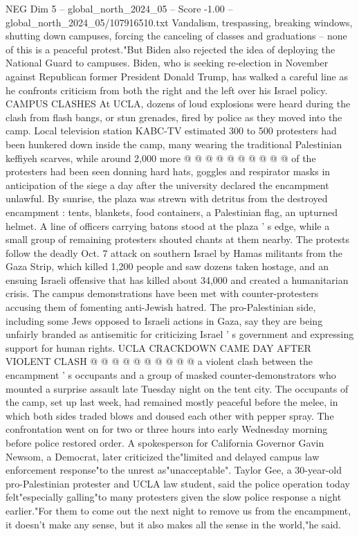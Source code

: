 \begin{textsample}{NEG Dim 5 – global\_north\_2024\_05 – Score -1.00 – global\_north\_2024\_05/107916510.txt}
Vandalism, trespassing, breaking windows, shutting down campuses, forcing the canceling of classes and graduations -- none of this is a peaceful protest."But Biden also rejected the idea of deploying the National Guard to campuses.
Biden, who is seeking re-election in November against Republican former President Donald Trump, has walked a careful line as he confronts criticism from both the right and the left over his Israel policy.
CAMPUS CLASHES At UCLA, dozens of loud explosions were heard during the clash from flash bangs, or stun grenades, fired by police as they moved into the camp.
Local television station KABC-TV estimated 300 to 500 protesters had been hunkered down inside the camp, many wearing the traditional Palestinian keffiyeh scarves, while around 2,000 more @ @ @ @ @ @ @ @ @ @ of the protesters had been seen donning hard hats, goggles and respirator masks in anticipation of the siege a day after the university declared the encampment unlawful.
By sunrise, the plaza was strewn with detritus from the destroyed encampment : tents, blankets, food containers, a Palestinian flag, an upturned helmet.
A line of officers carrying batons stood at the plaza ' s edge, while a small group of remaining protesters shouted chants at them nearby.
The protests follow the deadly Oct. 7 attack on southern Israel by Hamas militants from the Gaza Strip, which killed 1,200 people and saw dozens taken hostage, and an ensuing Israeli offensive that has killed about 34,000 and created a humanitarian crisis.
The campus demonstrations have been met with counter-protesters accusing them of fomenting anti-Jewish hatred.
The pro-Palestinian side, including some Jews opposed to Israeli actions in Gaza, say they are being unfairly branded as antisemitic for criticizing Israel ' s government and expressing support for human rights.
UCLA CRACKDOWN CAME DAY AFTER VIOLENT CLASH @ @ @ @ @ @ @ @ @ @ a violent clash between the encampment ' s occupants and a group of masked counter-demonstrators who mounted a surprise assault late Tuesday night on the tent city.
The occupants of the camp, set up last week, had remained mostly peaceful before the melee, in which both sides traded blows and doused each other with pepper spray.
The confrontation went on for two or three hours into early Wednesday morning before police restored order.
A spokesperson for California Governor Gavin Newsom, a Democrat, later criticized the"limited and delayed campus law enforcement response"to the unrest as"unacceptable".
Taylor Gee, a 30-year-old pro-Palestinian protester and UCLA law student, said the police operation today felt"especially galling"to many protesters given the slow police response a night earlier."For them to come out the next night to remove us from the encampment, it doesn't make any sense, but it also makes all the sense in the world,"he said.

\end{textsample}
